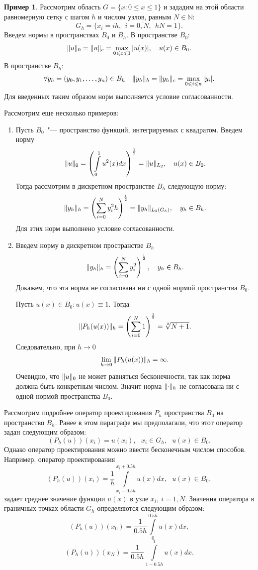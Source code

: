 \documentclass[11pt,a4paper,twoside]{report}
\numberwithin{equation}{section}
\theoremstyle{definition}
\newtheorem*{example*}{Пример}
\theoremstyle{plain}
\DeclarePairedDelimiter\norm{\lVert}{\rVert}
\begin{document}
%
\begin{example*}
%
Рассмотрим область $G = \{ x: 0 \leqslant x \leqslant 1\}$ и зададим на этой области
равномерную сетку с шагом $h$ и числом узлов, равным $N \in \mathbb{N}$:
%
$$
    G_h = \{x_i = ih,~~i = \overline{0,N},~~hN = 1 \}.
$$
%
Введем нормы в пространствах $B_0$ и  $B_h$. В пространстве $B_0$:
%
$$
    \norm{u}_0=\norm{u}_c=\max_{0 \leqslant x \leqslant 1}{|u(x)|},~~~u(x)\in B_0.
$$
%
В пространстве $B_h$:
%
$$
    \forall y_h=(y_0,y_1,\ldots,y_n) \in B_h
%
%
    ~~~\norm{y_h}_h=\norm{y_h}_c=\max_{0\leqslant i \leqslant n}{|y_i|}.
$$
%
Для введенных таким образом норм выполняется условие согласованности.
%
\end{example*}
%
Рассмотрим еще несколько примеров:
%
\begin{enumerate}
%
    \item
        Пусть $B_0$~"--- пространство функций, интегрируемых с квадратом. Введем норму
        $$
            \norm{u}_0 = \left(\int\limits_0^1{u^2(x)dx}\right)^{\frac12}=\norm{u}_{L_2},~~~u(x) \in B_0.
        $$
        Тогда рассмотрим в дискретном пространстве $B_h$ следующую норму:
        $$
             \norm{y_h}_h = \left(\sum_{i=0}^N{y_i^2 h}\right)^{\frac12}=\norm{y_h}_{L_2(G_h)},~~~y_h \in B_h.
        $$
        Для этих норм выполнено условие согласованности.
    \item
        Введем норму в дискретном пространстве $B_h$
        $$
            \norm{y_h}_h= \left( \sum_{i = 0}^N {y_i^2}\right)^{\frac12},~~~y_h \in B_h.
        $$
        Докажем, что эта норма не согласована ни с одной нормой пространства $B_0$.

        Пусть $u(x)\in B_0: u(x) \equiv 1$.
        Тогда
        $$
            \norm{P_h(u(x))}_h=\left( \sum_{i = 0}^N {1}\right)^{\frac12}= \sqrt[2]{N+1}.
        $$
        Следовательно, при $h\rightarrow0$
        $$
            \lim\limits_{h\rightarrow0}{\norm{P_h(u(x))}_h}=\infty.
        $$
        Очевидно, что $\norm{u}_0$ не может равняться бесконечности,
        так как норма должна быть конкретным числом. Значит норма $\norm{\cdot}_h$
        не согласована ни с одной нормой пространства $B_0$.
%
\end{enumerate}
%


Рассмотрим подробнее оператор проектирования $P_h$ пространства $B_0$
на пространство $B_h$. Ранее в этом параграфе мы предполагали, что
этот оператор задан следующим образом:
%
$$
    (P_h(u))(x_i)=u(x_i),~~~x_i\in G_h,~~~u(x) \in B_0.
$$
%
Однако оператор проектирования можно ввести бесконечным числом способов.
Например, оператор проектирования
%
$$
    (P_h(u))(x_i) = \frac1h \int\limits_{x_i - 0.5h}^{x_i + 0.5h}{u(x)dx},~~~u(x) \in B_0,
$$
%
задает среднее значение функции $u(x)$ в узле $x_i,~i=\overline{1,N}$. Значения оператора
в граничных точках области $G_h$ определяются следующим образом:
%
$$
    (P_h(u))(x_0) = \frac1{0.5h} \int\limits_{0}^{0.5h}{u(x)dx},
$$
%
$$
    (P_h(u))(x_N) = \frac1{0.5h} \int\limits_{1-0.5h}^{1}{u(x)dx}.
$$
%
\end{document}
